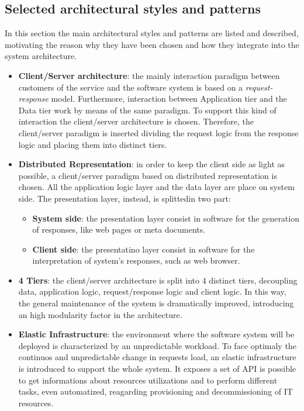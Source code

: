 \subsection{Selected architectural styles and patterns}

\label{sec:selected-styles-patterns}

In this section the main architectural styles and patterns are listed and described, motivating the reason why they have been chosen and how they integrate into the system architecture.

\begin{itemize}	
	\item \textbf{Client/Server architecture}: the mainly interaction paradigm between customers of the service and the software system is based on a \textit{request-response} model. Furthermore, interaction between Application tier and the Data tier work by means of the same paradigm. To support this kind of interaction the client/server architecture is chosen. Therefore, the client/server paradigm is inserted dividing the request logic from the response logic and placing them into distinct tiers. 
	\item \textbf{Distributed Representation}: in order to keep the client side as light as possible, a client/server paradigm based on distributed representation is chosen. All the application logic layer and the data layer are place on system side. The presentation layer, instead, is splittedin two part:
	\begin{itemize}
		\item \textbf{System side}: the presentation layer consist in software for the generation of responses, like web pages or meta documents.
		\item \textbf{Client side}: the presentatino layer consist in software for the interpretation of system's responses, such as web browser.
	\end{itemize}
	\item \textbf{4 Tiers}: the client/server architecture is split into 4 distinct tiers, decoupling data, application logic, request/response logic and client logic. In this way, the general maintenance of the system is dramatically improved, introducing an high modularity factor in the architecture.
	\item \textbf{Elastic Infrastructure}: the environment where the software system will be deployed is characterized by an unpredictable workload. To face optimaly the continuos and unpredictable change in requests load, an elastic infrastructure is introduced to support the whole system. It exposes a set of API is possible to get informations about resources utilizations and to perform different tasks, even automatized, reagarding provisioning and decommissioning of IT resources.

\end{itemize}
